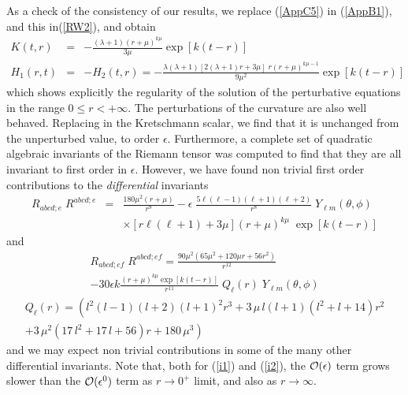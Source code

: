 \documentclass[12pt,aps,floats,showpacs,amssymb,tightenlines]{revtex4}
\newcommand{\e}{\epsilon}
\newcommand{\m}{\mu}
\begin{document}
As a check of the consistency of our results, we replace (\ref{AppC5}) in (\ref{AppB1}),
 and this in(\ref{RW2}), and obtain
\begin{eqnarray} \label{us}
\label{RW24a}
 K(t,r) & = & -\frac{ (\lambda + 1)(r+\mu)^{k \mu}}{3 \mu}\exp[k(t- r)]   \\
 H_1(r,t) & = & -H_2(t,r) = -\frac{\lambda (\lambda+1)
   [2(\lambda+1) r+ 3 \mu] \; r  (r+\mu)^{k\mu -1}}{9 \mu^2}\exp[k(t- r)] \nonumber
\end{eqnarray}
which shows explicitly the regularity of the solution of the perturbative equations in the
 range $0 \leq r < +\infty$. The perturbations of the curvature are also well behaved.
Replacing in the Kretschmann scalar, we find that it is unchanged from the unperturbed value,
to order $\epsilon$.
Furthermore, a complete set of quadratic algebraic invariants of the
Riemann tensor \cite{cm,zm} was computed to find  that they are all
invariant to first order in $\epsilon$. However, we have found non
trivial first order contributions to the  {\em differential}
invariants
\begin{eqnarray} \label{i1}
R_{abcd;e} \; R^{abcd;e} &=& \frac{180 \mu^2 (r + \mu)}{r^9} - \e \;
  \frac{ 5 \ell (\ell-1) (\ell+1)(\ell+2)}{r^8}  \;  Y_{\ell m}(\theta,\phi)\\
\nonumber && \times  \left[ r \ell (\ell+1) + 3 \mu \right]
  (r+\mu)^{k \mu} \;
 \exp[k (t-r)]
\end{eqnarray}
and \begin{multline}
 \label{i2}
R_{abcd;ef} \; R^{abcd;ef} = \frac{90 \m^2 (65 \m^2 +120 \m r+56
r^2)}{r^{12}} \\- 30 \e k \frac{(r+\mu)^{k \mu} \exp[k
(t-r)]}{r^{11}} \; Q_{\ell}(r) \;Y_{\ell m}(\theta,\phi)
\end{multline}
\begin{multline}
Q_{\ell}(r) = \left( {l}^{2} \left( l-1 \right)  \left( l+2 \right)
\left( l+1 \right) ^{2 }{r}^{3}+3\,\mu\,l \left( l+1 \right)  \left(
{l}^{2}+l+14 \right) {r} ^{2} \right. \\ \left.+ 3 \,{\mu}^{2}
\left( 17\,{l}^{2}+17\,l+56 \right) r+180\,{\mu}^{3} \right)
\end{multline}
and we may expect non trivial contributions in some of the many other differential
invariants. Note that, both for  (\ref{i1}) and (\ref{i2}),
the ${\cal O} (\e)$ term  grows slower than the ${\cal O} (\e^0)$ term as
$r \to 0^+$ limit, and also as $r \to \infty$.
\end{document}
